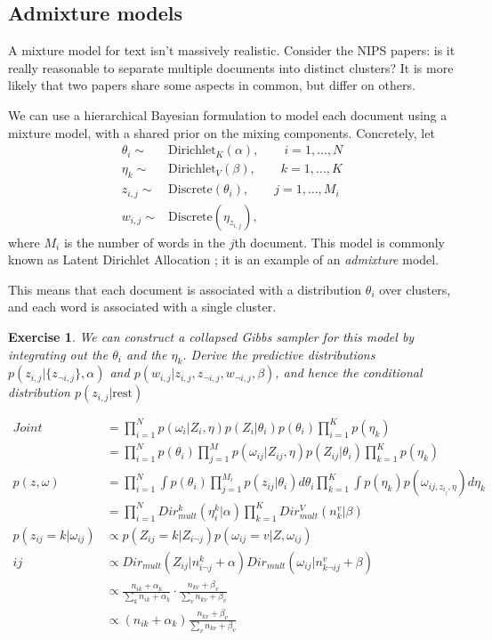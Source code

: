 \documentclass[twoside]{article}
\newcounter{lecnum}
\newtheorem{exercise}{Exercise}[lecnum]
\begin{document}
\subsection{Admixture models}
 A mixture model for text isn't massively realistic. Consider the NIPS papers: is it really reasonable to separate multiple documents into distinct clusters? It is more likely that two papers share some aspects in common, but differ on others.

 We can use a hierarchical Bayesian formulation to model each document using a mixture model, with a shared prior on the mixing components. Concretely, let
 $$\begin{aligned}
   \theta_i\sim& \mbox{Dirichlet}_K(\alpha),\qquad i=1,\dots,N\\
   \eta_k \sim& \mbox{Dirichlet}_V(\beta),\qquad k=1,\dots,K\\
   z_{i,j} \sim& \mbox{Discrete}(\theta_i),\qquad j=1,\dots, M_i\\
   w_{i,j} \sim& \mbox{Discrete}(\eta_{z_{i,j}}),\end{aligned}$$
 where $M_i$ is the number of words in the $j$th document. This model is commonly known as Latent Dirichlet Allocation \cite{BleNgJor2003}; it is an example of an \textit{admixture} model.
 
 This means that each document is associated with a distribution $\theta_i$ over clusters, and each word is associated with a single cluster.

 \begin{exercise}
   We can construct a collapsed Gibbs sampler for this model by integrating out the $\theta_i$ and the $\eta_k$. Derive the predictive distributions  $p(z_{i,j}|\{z_{\neg i,j}\}, \alpha)$ and $p(w_{i,j}|z_{i,j},z_{\neg i,j},w_{\neg i,j},\beta)$, and hence the conditional distribution $p(z_{i,j}|\mbox{rest})$
 \end{exercise}
 
\begin{equation*}
\begin{split}
Joint &= \prod_{i=1}^N p(\omega_i|Z_i,\eta)p(Z_i|\theta_i)p(\theta_i)\prod_{i=1}^Kp(\eta_k)\\
&=\prod_{i=1}^N p(\theta_i)\prod_{j=1}^M p(\omega_{ij}|Z_{ij},\eta)p(Z_{ij}|\theta_i)\prod_{k=1}^Kp(\eta_k)\\
p(z,\omega)&=\prod_{i=1}^N\int p(\theta_i)\prod_{j=1}^{M_i}p(z_{ij}|\theta_i)d\theta_i\prod_{k=1}^K\int p(\eta_k)p(\omega_{ij,z_{i_j},\eta})d\eta_k\\
&=\prod_{i=1}^NDir_{mult}^k(\eta_i^k|\alpha)\prod_{k=1}^KDir_{mult}^V(n_k^v|\beta)\\
p(z_{ij}=k|\omega_{ij})&\propto p(Z_{ij}=k|Z_{i\neg j})p(\omega_{ij}=v|Z,\omega_{ij})\\ij
&\propto Dir_{mult}(Z_{ij}|n_{i\neg j}^k+\alpha)Dir_{mult}(\omega_{ij}|n_{k\neg ij}^v+\beta)\\
&\propto \frac{n_{ik}+\alpha_k}{\sum_k n_{ik} + \alpha_k}\cdot \frac{n_{kv}+\beta_v}{\sum_v n_{kv}+\beta_v}\\
&\propto (n_{ik}+\alpha_k)\frac{n_{kv}+\beta_v}{\sum_v n_{kv}+\beta_v}
\end{split}
\end{equation*}
\end{document}
